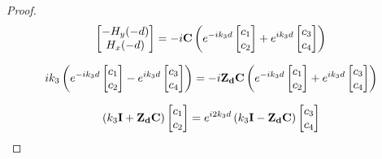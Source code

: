 \begin{proof}
            \begin{equation}
                \begin{bmatrix}
                    -H_y(-d)\\
                    H_x(-d)\\
                \end{bmatrix}
                =-i
                \mathbf{C}
                \left(
                    e^{-ik_3 d}
                    \begin{bmatrix}
                        c_1 \\
                        c_2
                    \end{bmatrix}
                    +e^{ik_3 d}
                    \begin{bmatrix}
                        c_3 \\
                        c_4
                    \end{bmatrix}
                \right)
            \end{equation}

            \begin{equation}
                ik_3\left( e^{-ik_3 d}
                \begin{bmatrix}
                    c_1 \\
                    c_2
                \end{bmatrix}
                -e^{ik_3 d}
                \begin{bmatrix}
                    c_3 \\
                    c_4
                \end{bmatrix}
                \right)
                =-i\mathbf{Z_d}\mathbf{C}
                \left(
                    e^{-ik_3 d}
                    \begin{bmatrix}
                        c_1 \\
                        c_2
                    \end{bmatrix}
                    +e^{ik_3 d}
                    \begin{bmatrix}
                        c_3 \\
                        c_4
                    \end{bmatrix}
                \right)
            \end{equation}

            \begin{equation}
                \left(k_3\mathbf{I} + \mathbf{Z_d}\mathbf{C}\right)
                \begin{bmatrix}
                    c_1 \\
                    c_2
                \end{bmatrix}
                = e^{i2k_3 d} \left(k_3\mathbf{I} - \mathbf{Z_d}\mathbf{C}\right)
                \begin{bmatrix}
                    c_3 \\
                    c_4
                \end{bmatrix}
            \end{equation}


\end{proof}
